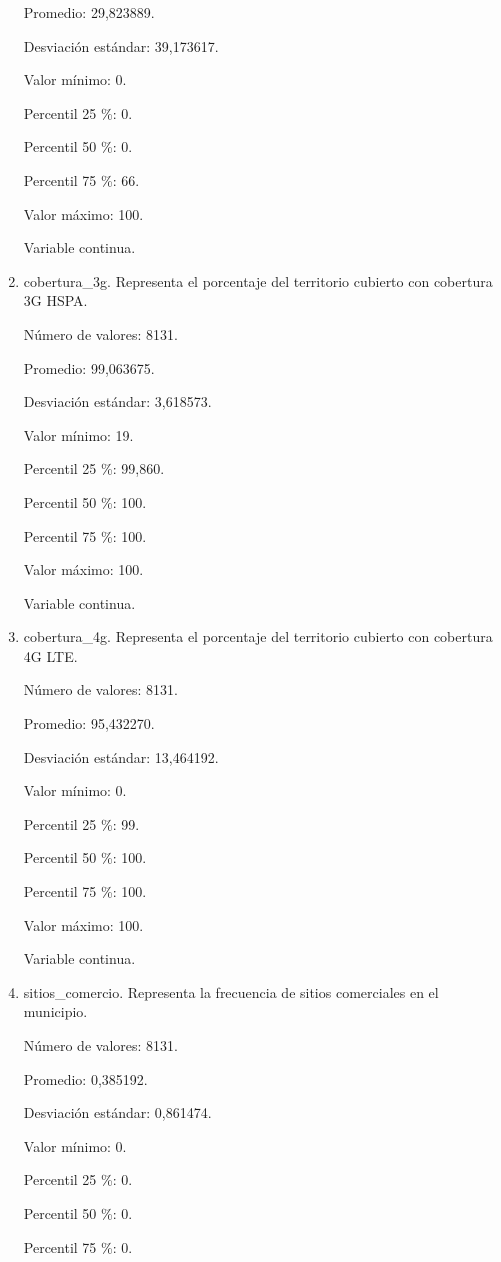 \begin{enumerate}
	Promedio: 29,823889.
	
	Desviación estándar: 39,173617.
	
	Valor mínimo: 0.
	
	Percentil 25 \%: 0.
	
	Percentil 50 \%: 0.
	
	Percentil 75 \%: 66.
	
	Valor máximo: 100.
	
	Variable continua.

	\item cobertura\_3g. Representa el porcentaje del territorio cubierto con cobertura 3G HSPA.
	
	Número de valores: 8131.
	
	Promedio: 99,063675.
	
	Desviación estándar: 3,618573.
	
	Valor mínimo: 19.
	
	Percentil 25 \%: 99,860.
	
	Percentil 50 \%: 100.
	
	Percentil 75 \%: 100.
	
	Valor máximo: 100.
	
	Variable continua.

	\item cobertura\_4g. Representa el porcentaje del territorio cubierto con cobertura 4G LTE.
	
	Número de valores: 8131.
	
	Promedio: 95,432270.
	
	Desviación estándar: 13,464192.
	
	Valor mínimo: 0.
	
	Percentil 25 \%: 99.
	
	Percentil 50 \%: 100.
	
	Percentil 75 \%: 100.
	
	Valor máximo: 100.
	
	Variable continua.

	\item sitios\_comercio. Representa la frecuencia de sitios comerciales en el municipio.
	
	Número de valores: 8131.
	
	Promedio: 0,385192.
	
	Desviación estándar: 0,861474.
	
	Valor mínimo: 0.
	
	Percentil 25 \%: 0.
	
	Percentil 50 \%: 0.
	
	Percentil 75 \%: 0.
	

\end{enumerate}
